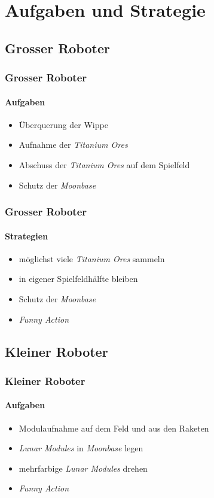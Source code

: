 \section{Aufgaben und Strategie}


\subsection{Grosser Roboter}

\begin{frame}
	\frametitle{Grosser Roboter}
	\framesubtitle{Aufgaben}
	\begin{itemize}
		\item Überquerung der Wippe
		\item Aufnahme der \textit{Titanium Ores}
		\item Abschuss der \textit{Titanium Ores} auf dem Spielfeld
		\item Schutz der \textit{Moonbase} %
	\end{itemize}
\end{frame}

\begin{frame}
	
	
	\frametitle{Grosser Roboter}
	\framesubtitle{Strategien}
	\begin{itemize}
		\item möglichst viele \textit{Titanium Ores} sammeln
		\item in eigener Spielfeldhälfte bleiben
		\item Schutz der \textit{Moonbase}
		\item \textit{Funny Action}
	\end{itemize}
\end{frame}

\subsection{Kleiner Roboter}

\begin{frame}
	\frametitle{Kleiner Roboter}
	\framesubtitle{Aufgaben}
	\begin{itemize}
		\item Modulaufnahme auf dem Feld und aus den Raketen
		\item \textit{Lunar Modules} in \textit{Moonbase} legen
		\item mehrfarbige \textit{Lunar Modules} drehen
		\item \textit{Funny Action}
	\end{itemize}
\end{frame}

